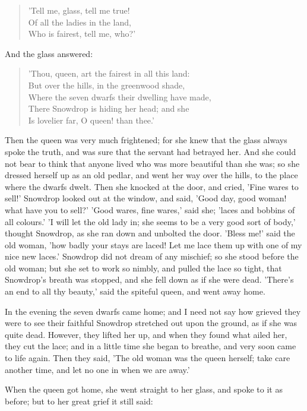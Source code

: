 \documentclass[12pt]{book}
\begin{document}
\begin{verse}
 'Tell me, glass, tell me true!\\
  Of all the ladies in the land,\\
  Who is fairest, tell me, who?'
\end{verse}

And the glass answered:

\begin{verse}
 'Thou, queen, art the fairest in all this land:\\
  But over the hills, in the greenwood shade,\\
  Where the seven dwarfs their dwelling have made,\\
  There Snowdrop is hiding her head; and she\\
  Is lovelier far, O queen! than thee.'
\end{verse}

Then the queen was very much frightened; for she knew that the glass
always spoke the truth, and was sure that the servant had betrayed
her. And she could not bear to think that anyone lived who was more
beautiful than she was; so she dressed herself up as an old pedlar,
and went her way over the hills, to the place where the dwarfs dwelt.
Then she knocked at the door, and cried, 'Fine wares to sell!'
Snowdrop looked out at the window, and said, 'Good day, good woman!
what have you to sell?' 'Good wares, fine wares,' said she; 'laces and
bobbins of all colours.' 'I will let the old lady in; she seems to be
a very good sort of body,' thought Snowdrop, as she ran down and
unbolted the door. 'Bless me!' said the old woman, 'how badly your
stays are laced! Let me lace them up with one of my nice new laces.'
Snowdrop did not dream of any mischief; so she stood before the old
woman; but she set to work so nimbly, and pulled the lace so tight,
that Snowdrop's breath was stopped, and she fell down as if she were
dead. 'There's an end to all thy beauty,' said the spiteful queen,
and went away home.

In the evening the seven dwarfs came home; and I need not say how
grieved they were to see their faithful Snowdrop stretched out upon
the ground, as if she was quite dead. However, they lifted her up, and
when they found what ailed her, they cut the lace; and in a little
time she began to breathe, and very soon came to life again. Then they
said, 'The old woman was the queen herself; take care another time,
and let no one in when we are away.'

When the queen got home, she went straight to her glass, and spoke to
it as before; but to her great grief it still said:
\end{document}
